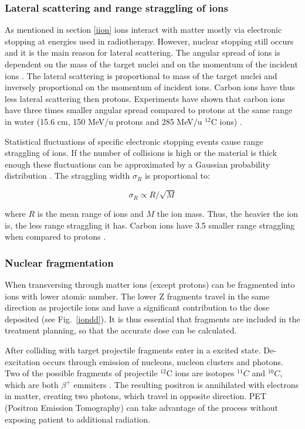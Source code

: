 \documentclass[type=dr, dr=rernat, accentcolor=tud7b,colorbacktitle, bigchapter, openright, twoside, 12pt ]{tudthesis}
\begin{document}
\subsubsection{Lateral scattering and range straggling of ions}
\label{scat}
As mentioned in section \ref{iion} ions interact with matter mostly via electronic stopping at energies used in radiotherapy. However, nuclear stopping still occurs and it is the main reason for lateral scattering.
The angular spread of ions is dependent on the mass of the target nuclei and on the momentum of the incident ions \cite{Moliere1948}. The lateral scattering is proportional to mass of the target nuclei and inversely proportional
on the momentum of incident ions. Carbon ions have thus less lateral scattering then protons. Experiments have shown that carbon ions have three times smaller angular spread compared to protons at the same range in water 
(15.6 cm, 150 MeV/u protons and 285 MeV/u $^{12}$C ions) \cite{Schardt2010}.

Statistical fluctuations of specific electronic stopping events cause range straggling of ions. If the number of collisions is high or the material is thick enough these fluctuations can be approximated by
a Gaussian probability distribution \cite{Bohr1940, Ahlen1980}. The straggling width $\sigma_R$ is proportional to:

\begin{equation}
 \sigma_R \propto R/\sqrt{M}
\end{equation}

where $R$ is the mean range of ions and $M$ the ion mass. Thus, the heavier the ion is, the less range straggling it has. Carbon ions have 3.5 smaller range straggling when compared to protons \cite{Schardt2010}.

\subsubsection{Nuclear fragmentation}
\label{nuclfrag}

When transversing through matter ions (except protons) can be fragmented into ions with lower atomic number. The lower Z fragments travel in the same direction as projectile ions and 
have a significant contribution to the dose deposited (see Fig.~\ref{iondd}). It is thus essential that fragments are included in the treatment planning, so that the accurate dose can be calculated.

After colliding with target projectile fragments enter in a excited state. De-excitation occurs through
emission of nucleons, nucleon clusters and photons. Two of the possible fragments of projectile $^{12}$C ions are isotopes $^{11}C$ and $^{10}C$, which are both $\beta^+$ emmiters \cite{Kraft2000}.
The resulting positron is annihilated with electrons in matter, creating two photons, which travel in opposite direction. PET (Positron Emission Tomography) can take advantage of the process without exposing patient to additional radiation.
\end{document}
